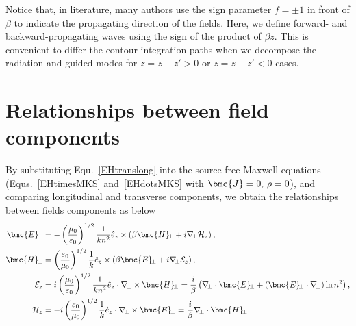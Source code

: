 Notice that, in literature, many authors use the sign parameter $ f=\pm 1 $ in front of $ \beta $ to indicate the propagating direction of the fields. Here, we define forward- and backward-propagating waves using the sign of the product of $ \beta z $. This is convenient to differ the contour integration paths when we decompose the radiation and guided modes for $ z=z-z'>0 $ or $ z=z-z'<0 $ cases. 

\section{Relationships between field components}\label{MWE:components}
By substituting Equ.~\ref{EHtranslong} into the source-free Maxwell equations 
(Equs.~\ref{EHtimesMKS} and~\ref{EHdotsMKS} with $ \bmc{J}=0,\, \rho=0 $), and comparing 
longitudinal and transverse components, we obtain the relationships between fields components as 
below
\begin{subequations}
\label{EHtz0}
\begin{align}
\bmc{E}\!_\perp &= -\left(\frac{\mu_0}{\varepsilon_0} \right)^{1/2} \frac{1}{kn^2} \hat{e}_z \times 
\left(\beta \bmc{H}\!_\perp + i\nabla\!_\perp \mathcal{H}_z \right),\\
\bmc{H}\!_\perp &= \left(\frac{\varepsilon_0}{\mu_0} \right)^{1/2} \frac{1}{k} \hat{e}_z \times \left(\beta 
\bmc{E}\!_\perp +i\nabla\!_\perp \mathcal{E}_z \right),\\
\mathcal{E}_z &= i\left(\frac{\mu_0}{\varepsilon_0} \right)^{1/2} \frac{1}{kn^2} \hat{e}_z \cdot 
\nabla\!_\perp \times \bmc{H}\!_\perp = \frac{i}{\beta} \left( \nabla\!_\perp \cdot \bmc{E}\!_\perp + 
(\bmc{E}\!_\perp \cdot \nabla\!_\perp) \ln n^2 \right),\\
\mathcal{H}_z &= -i \left(\frac{\varepsilon_0}{\mu_0} \right)^{1/2} \frac{1}{k}\hat{e}_z \cdot 
\nabla\!_\perp \times \bmc{E}\!_\perp = \frac{i}{\beta} \nabla\!_\perp \cdot \bmc{H}\!_\perp. 
\end{align}
\end{subequations}

